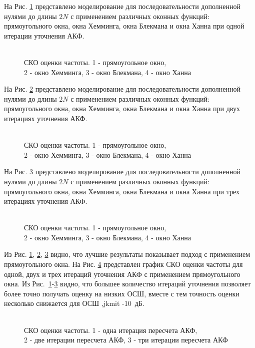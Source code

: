 На Рис. \ref{pic:fft2_1} представлено моделирование для последовательности дополненной нулями до длины ${2N}$ с применением различных оконных функций:
прямоугольного окна, окна Хемминга, окна Блекмана и окна Ханна при одной итерации уточнения АКФ.
\begin{figure}[h]
	\center{}
	\caption{\\СКО оценки частоты. 1 - прямоугольное окно,\\2 - окно Хемминга, 3 - окно Блекмана, 4 - окно Ханна}
	\label{pic:fft2_1}
\end{figure}

На Рис. \ref{pic:fft2_2} представлено моделирование для последовательности дополненной нулями до длины ${2N}$ с применением различных оконных функций:
прямоугольного окна, окна Хемминга, окна Блекмана и окна Ханна при двух итерациях уточнения АКФ.
\begin{figure}[h]
	\center{}
	\caption{\\СКО оценки частоты. 1 - прямоугольное окно,\\2 - окно Хемминга, 3 - окно Блекмана, 4 - окно Ханна}
	\label{pic:fft2_2}
\end{figure}

На Рис. \ref{pic:fft2_3} представлено моделирование для последовательности дополненной нулями до длины ${2N}$ с применением различных оконных функций:
прямоугольного окна, окна Хемминга, окна Блекмана и окна Ханна при трех итерациях уточнения АКФ.
\begin{figure}[h]
	\center{}
	\caption{\\СКО оценки частоты. 1 - прямоугольное окно,\\2 - окно Хемминга, 3 - окно Блекмана, 4 - окно Ханна}
	\label{pic:fft2_3}
\end{figure}

Из Рис. \ref{pic:fft2_1}, \ref{pic:fft2_2}, \ref{pic:fft2_3} видно, что лучшие результаты показывает подход с применением прямоугольного окна. На Рис. \ref{pic:fft2_rect_1_2_3}
представлен график СКО оценки частоты для одной, двух и трех итераций уточнения АКФ с применением прямоугольного окна. Из \mbox{Рис. \ref{pic:fft2_1}-\ref{pic:fft2_3}}  видно, что большее
количество итераций уточнения позволяет более точно получать оценку на низких ОСШ, вместе с тем точность оценки несколько снижается для ОСШ ,jkmit \mbox{-10 дБ.}
\begin{figure}[h]
	\center{}
	\caption{\\СКО оценки частоты. 1 - одна итерация пересчета АКФ,\\2 - две итерации пересчета АКФ, 3 - три итерации пересчета АКФ}
	\label{pic:fft2_rect_1_2_3}
\end{figure}

